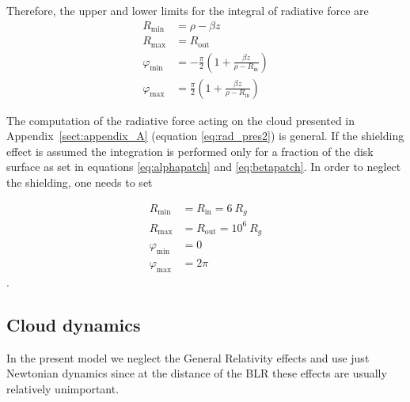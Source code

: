 \documentclass[twocolumn]{aastex62}
\begin{document}
Therefore, the upper and lower limits for the integral of radiative force are
\begin{equation}\label{eq:betapatch}
\begin{array}{ll}
R_{\mathrm{min}} & = \rho - \beta z  \\
R_{\mathrm{max}} & = R_{\mathrm{out}}  \\
\varphi_{\mathrm{min}} & =- \frac{\pi}{2} \left( 1 + \frac{\beta z}{\rho - R_{\mathrm{in}}}\right)  \\
\varphi_{\mathrm{max}} & =  \frac{\pi}{2} (1 + \frac{\beta z}{\rho - R_{\mathrm{in}}})
\end{array}
\end{equation}

The computation of the radiative force acting on the cloud presented in Appendix~\ref{sect:appendix_A} (equation \ref{eq:rad_pres2}) is general. If the shielding effect is assumed the integration is performed only for a fraction of the disk surface as set in equations \ref{eq:alphapatch} and \ref{eq:betapatch}. In order to neglect the shielding, one needs to set

\begin{equation}
\begin{array}{ll}
R_{\mathrm{min}} & = R_{\mathrm{in}} = 6\ R_{g}  \\
R_{\mathrm{max}} & = R_{\mathrm{out}} = 10^{6}\ R_{g}  \\
\varphi_{\mathrm{min}} & = 0 \\
\varphi_{\mathrm{max}} & = 2\pi
\end{array}
\end{equation}.

\subsection{Cloud dynamics}\label{sec:CloudDynamics}

In the present model we neglect the General Relativity effects and use just Newtonian dynamics since at the distance of the BLR these effects are usually relatively unimportant.
\end{document}
